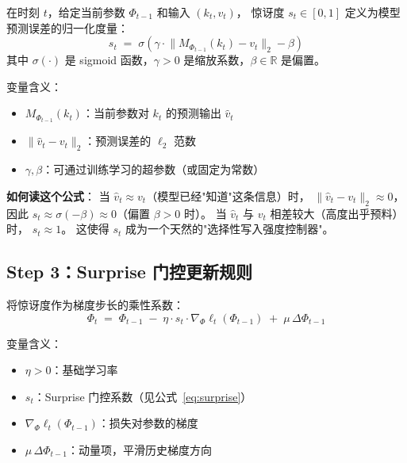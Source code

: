 \begin{definition}
\label{def:surprise}
在时刻 $t$，给定当前参数 $\Phi_{t-1}$ 和输入 $(k_t, v_t)$，
惊讶度 $s_t \in [0,1]$ 定义为模型预测误差的归一化度量：
\begin{equation}
  s_t \;=\; \sigma\!\left(\gamma \cdot \bigl\| M_{\Phi_{t-1}}(k_t) - v_t \bigr\|_2 - \beta \right)
  \label{eq:surprise}
\end{equation}
其中 $\sigma(\cdot)$ 是 sigmoid 函数，$\gamma > 0$ 是缩放系数，$\beta \in \mathbb{R}$ 是偏置。

变量含义：
\begin{itemize}
  \item $M_{\Phi_{t-1}}(k_t)$：当前参数对 $k_t$ 的预测输出 $\hat{v}_t$
  \item $\bigl\| \hat{v}_t - v_t \bigr\|_2$：预测误差的 $\ell_2$ 范数
  \item $\gamma, \beta$：可通过训练学习的超参数（或固定为常数）
\end{itemize}
\end{definition}

\textbf{如何读这个公式}：
当 $\hat{v}_t \approx v_t$（模型已经"知道"这条信息）时，
$\bigl\|\hat{v}_t - v_t\bigr\|_2 \approx 0$，
因此 $s_t \approx \sigma(-\beta) \approx 0$（偏置 $\beta > 0$ 时）。
当 $\hat{v}_t$ 与 $v_t$ 相差较大（高度出乎预料）时，
$s_t \approx 1$。
这使得 $s_t$ 成为一个天然的"选择性写入强度控制器"。

\subsection*{Step 3：Surprise 门控更新规则}

将惊讶度作为梯度步长的乘性系数：
\begin{equation}
  \boxed{
    \Phi_t \;=\; \Phi_{t-1}
      \;-\; \eta \cdot s_t \cdot \nabla_\Phi \ell_t(\Phi_{t-1})
      \;+\; \mu\,\Delta\Phi_{t-1}
  }
  \label{eq:titans_update}
\end{equation}

变量含义：
\begin{itemize}
  \item $\eta > 0$：基础学习率
  \item $s_t$：Surprise 门控系数（见公式~\eqref{eq:surprise}）
  \item $\nabla_\Phi \ell_t(\Phi_{t-1})$：损失对参数的梯度
  \item $\mu\,\Delta\Phi_{t-1}$：动量项，平滑历史梯度方向
\end{itemize}

